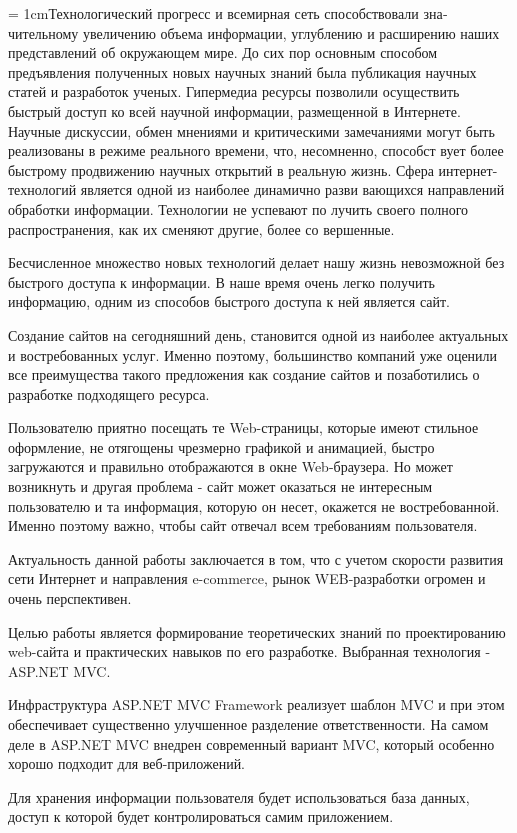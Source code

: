 \documentclass[14pt,a4paper]{extreport}
\begin{document}
	\parindent = 1cmТехнологический прогресс и всемирная сеть способствовали зна­чительному увеличению объема информации, углублению и расширению наших представлений об окружающем мире. До сих пор основным способом предъявления полученных новых научных знаний была публикация научных
статей и разработок ученых. Гипермедиа ресурсы позволили осуществить
быстрый доступ ко всей научной информации, размещенной в Интернете.
Научные дискуссии, обмен мнениями и критическими замечаниями могут
быть реализованы в режиме реального времени, что, несомненно, способст­
вует более быстрому продвижению научных открытий в реальную жизнь.
Сфера интернет-технологий является одной из наиболее динамично разви­
вающихся направлений обработки информации. Технологии не успевают по­
лучить своего полного распространения, как их сменяют другие, более со­
вершенные. \par
	Бесчисленное множество новых технологий делает нашу жизнь невозможной без быстрого доступа к информации. В наше время очень легко получить информацию, одним из способов быстрого доступа к ней является сайт.\par
	Создание сайтов на сегодняшний день, становится одной из наиболее актуальных и востребованных услуг. Именно поэтому, большинство компаний уже оценили все преимущества такого предложения как создание сайтов и позаботились о разработке подходящего ресурса.\par
	Пользователю приятно посещать те Web-страницы, которые имеют стильное оформление, не отягощены чрезмерно графикой и анимацией, быстро загружаются и правильно отображаются в окне Web-браузера. Но может возникнуть и другая проблема - сайт может оказаться не интересным пользователю и та информация, которую он несет, окажется не востребованной. Именно поэтому важно, чтобы сайт отвечал всем требованиям пользователя.\par
	Актуальность данной работы заключается в том, что с учетом скорости развития сети Интернет и направления e-commerce, рынок WEB-разработки огромен и очень перспективен.\par
	Целью работы является формирование теоретических знаний по проектированию web-сайта и практических навыков по его разработке. Выбранная технология - ASP.NET MVC.\par
	Инфраструктура ASP.NET MVC Framework реализует шаблон MVC и при этом обеспечивает существенно улучшенное разделение ответственности. На самом деле в ASP.NET MVC внедрен современный вариант MVC, который особенно хорошо подходит для веб-приложений.\par
	Для хранения информации пользователя будет использоваться база данных, доступ к которой будет контролироваться самим приложением.\par	
\end{document}
